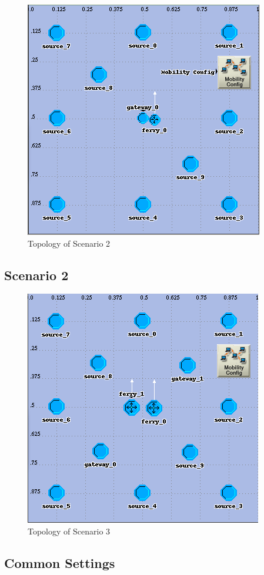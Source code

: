 \begin{figure}[h]
    \centering
    \includegraphics[width=.5\textwidth]{images/scenario2-top}
    \caption{Topology of Scenario 2}
    \label{fig:scenario2}
\end{figure}


\subsection{Scenario 2}


\begin{figure}[h]
    \centering
    \includegraphics[width=.5\textwidth]{images/scenario3-top}
    \caption{Topology of Scenario 3}
    \label{fig:scenario3}
\end{figure}


\subsection{Common Settings}




